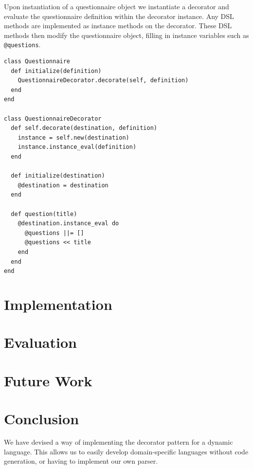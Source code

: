 \documentclass[10pt,fleqn,a4paper]{article}
\begin{document}
\begin{twocolumn}
Upon instantiation of a questionnaire object we instantiate a
decorator and evaluate the questionnaire definition within the
decorator instance. Any DSL methods are implemented as instance
methods on the decorator. These DSL methods then modify the
questionnaire object, filling in instance variables such as
\lstinline{@questions}.

\begin{lstlisting}
class Questionnaire
  def initialize(definition)
    QuestionnaireDecorator.decorate(self, definition)
  end
end

class QuestionnaireDecorator
  def self.decorate(destination, definition)
    instance = self.new(destination)
    instance.instance_eval(definition)
  end

  def initialize(destination)
    @destination = destination
  end

  def question(title)
    @destination.instance_eval do
      @questions ||= []
      @questions << title
    end
  end
end
\end{lstlisting}

\section{Implementation}



\section{Evaluation}


\section{Future Work}


\section{Conclusion}

We have devised a way of implementing the decorator pattern for a dynamic language. This allows us to easily develop domain-specific languages without code generation, or having to implement our own parser.





\end{twocolumn}
\end{document}
